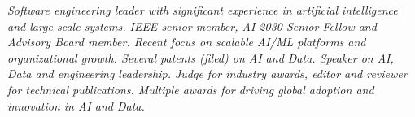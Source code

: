 {\selectfont
	\begin{justify}\textit{Software engineering leader with significant experience in artificial intelligence and large-scale systems. IEEE senior member, AI 2030 Senior Fellow and Advisory Board member. Recent focus on scalable AI/ML platforms and organizational growth. Several patents (filed) on AI and Data. Speaker on AI, Data and engineering leadership. Judge for industry awards, editor and reviewer for technical publications. Multiple awards for driving global adoption and innovation in AI and Data.}\end{justify}
}
\vspace{-12pt}